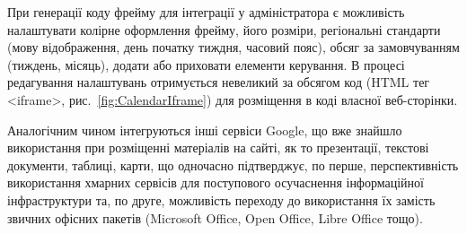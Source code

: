 При генерації коду фрейму для інтеграції у адміністратора є можливість налаштувати колірне оформлення фрейму, його розміри, регіональні стандарти (мову відображення, день початку тиждня, часовий пояс), обсяг за замовчуванням (тиждень, місяць), додати або приховати елементи керування. В процесі редагування налаштувань отримується невеликий за обсягом код (HTML тег <iframe>, рис.~\ref{fig:CalendarIframe}) для розміщення в коді власної веб-сторінки. 


Аналогічним чином інтегруються інші сервіси Google, що вже знайшло використання при розміщенні матеріалів на сайті, як то презентації, текстові документи, таблиці, карти, що одночасно підтверджує, по перше, перспективність використання хмарних сервісів для поступового осучаснення інформаційної інфраструктури та, по друге, можливість переходу до використання їх замість звичних офісних пакетів (Microsoft Office, Open Office, Libre Office тощо).
